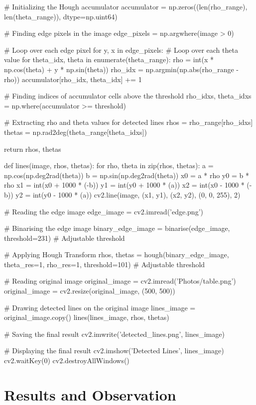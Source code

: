 \documentclass[letterpaper, 10 pt, conference]{ieeeconf}
\begin{document}
    # Initializing the Hough accumulator
    accumulator = np.zeros((len(rho_range), len(theta_range)), dtype=np.uint64)
    
    # Finding edge pixels in the image
    edge_pixels = np.argwhere(image > 0)
    
    # Loop over each edge pixel
    for y, x in edge_pixels:
        # Loop over each theta value
        for theta_idx, theta in enumerate(theta_range):
            rho = int(x * np.cos(theta) + y * np.sin(theta))
            rho_idx = np.argmin(np.abs(rho_range - rho))
            accumulator[rho_idx, theta_idx] += 1
    
    # Finding indices of accumulator cells above the threshold
    rho_idxs, theta_idxs = np.where(accumulator >= threshold)
    
    # Extracting rho and theta values for detected lines
    rhos = rho_range[rho_idxs]
    thetas = np.rad2deg(theta_range[theta_idxs])
    
    return rhos, thetas

def lines(image, rhos, thetas):
    for rho, theta in zip(rhos, thetas):
        a = np.cos(np.deg2rad(theta))
        b = np.sin(np.deg2rad(theta))
        x0 = a * rho
        y0 = b * rho
        x1 = int(x0 + 1000 * (-b))
        y1 = int(y0 + 1000 * (a))
        x2 = int(x0 - 1000 * (-b))
        y2 = int(y0 - 1000 * (a))
        cv2.line(image, (x1, y1), (x2, y2), (0, 0, 255), 2)

# Reading the edge image
edge_image = cv2.imread('edge.png')


# Binarising the edge image
binary_edge_image = binarise(edge_image, threshold=231)  # Adjustable threshold

# Applying Hough Transform
rhos, thetas = hough(binary_edge_image, theta_res=1, rho_res=1, threshold=101)  # Adjustable threshold

# Reading original image
original_image = cv2.imread('Photos/table.png')
original_image = cv2.resize(original_image, (500, 500))


# Drawing detected lines on the original image
lines_image = original_image.copy()
lines(lines_image, rhos, thetas)

# Saving the final result
cv2.imwrite('detected_lines.png', lines_image)

# Displaying the final result
cv2.imshow('Detected Lines', lines_image)
cv2.waitKey(0)
cv2.destroyAllWindows()


\section{Results and Observation}
\end{document}
